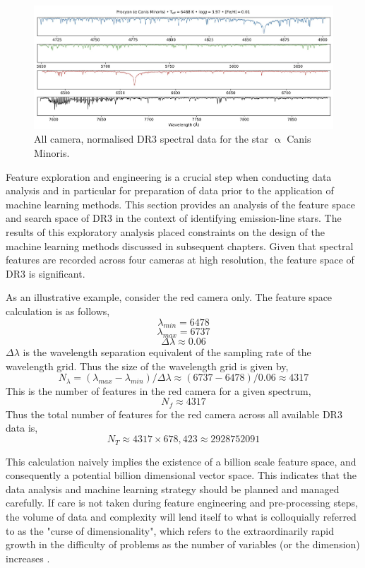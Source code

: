 \begin{figure}[!htb]
\centering
\includegraphics[scale=.25]{figures/galah cameras.jpeg}
\caption{All camera, normalised DR3 spectral data for the star $\upalpha$ Canis Minoris.}
\end{figure}

Feature exploration and engineering is a crucial step when conducting data analysis and in particular for preparation of data prior to the application of machine learning methods. This section provides an analysis of the feature space and search space of DR3 in the context of identifying emission-line stars. The results of this exploratory analysis placed constraints on the design of the machine learning methods discussed in subsequent chapters. Given that spectral features are recorded across four cameras at high resolution, the feature space of DR3 is significant. 

As an illustrative example, consider the red camera only. The feature space calculation is as follows,
\[\lambda_{min} = 6478\]
\[\lambda_{max} = 6737\]
\[\Delta\lambda \approx 0.06\]
$\Delta\lambda$ is the wavelength separation equivalent of the sampling rate of the wavelength grid. Thus the size of the wavelength grid is given by, \[N_{\lambda} = (\lambda_{max}-\lambda_{min})/\Delta\lambda \approx (6737-6478)/0.06 \approx 4317\]
This is the number of features in the red camera for a given spectrum, \[N_{f} \approx 4317\]
Thus the total number of features for the red camera across all available DR3 data is, \[N_{T} \approx 4317\times678,423 \approx \num[round-precision=2,round-mode=figures,
     scientific-notation=true]{2928752091}\]

This calculation naively implies the existence of a billion scale feature space, and consequently a potential billion dimensional vector space. This indicates that the data analysis and machine learning strategy should be planned and managed carefully. If care is not taken during feature engineering and pre-processing steps, the volume of data and complexity will lend itself to what is colloquially referred to as the "curse of dimensionality", which refers to the extraordinarily rapid growth in the difficulty of problems as the number of variables (or the dimension) increases \citep{kuo2005lifting}.

